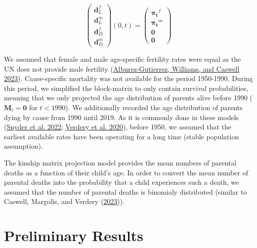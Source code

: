 \documentclass[
  11pt,
  letterpaper,
]{article}
\begin{document}
\[\begin{pmatrix} \boldsymbol{d}^f_L \\ 
\boldsymbol{d}^m_L \\ 
\hline \boldsymbol{d}^f_D \\ 
\boldsymbol{d}^m_D 
\end{pmatrix}(0, t)
=
\begin{pmatrix} \boldsymbol{\pi_t}^f \\ 
\boldsymbol{\pi_t}^m \\ 
\hline \boldsymbol{0} \\ 
\boldsymbol{0} 
\end{pmatrix}
\]

We assumed that female and male age-specific fertility rates were equal as the UN does not provide male fertility (\protect\hyperlink{ref-alburez2023projections}{Alburez-Gutierrez, Williams, and Caswell 2023}).
Cause-specific mortality was not available for the period 1950-1990. During this period, we simplified the block-matrix to only contain survival probabilities, meaning that we only projected the age distribution of parents alive before 1990 (\(\boldsymbol{M}_t = \boldsymbol{0}\) for \(t < 1990\)). We additionally recorded the age distribution of parents dying by cause from 1990 until 2019. As it is commonly done in these models (\protect\hyperlink{ref-snyder2022covid}{Snyder et al. 2022}; \protect\hyperlink{ref-verdery2020covid}{Verdery et al. 2020}), before 1950, we assumed that the earliest available rates have been operating for a long time (stable population assumption).

The kinship matrix projection model provides the mean numbers of parental deaths as a function of their child's age. In order to convert the mean number of parental deaths into the probability that a child experiences such a death, we assumed that the number of parental deaths is binomialy distributed (similar to Caswell, Margolis, and Verdery (\protect\hyperlink{ref-caswell2023formal}{2023})).

\hypertarget{preliminary-results}{%
\section{Preliminary Results}\label{preliminary-results}}
\end{document}
